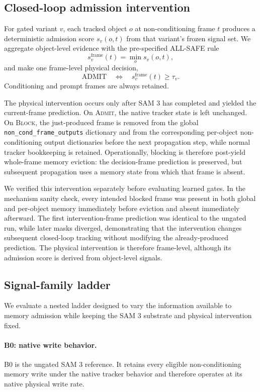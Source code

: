 \documentclass[10pt,twocolumn,letterpaper]{article}
\begin{document}
\subsection{Closed-loop admission intervention}

For gated variant \(v\), each tracked object \(o\) at non-conditioning frame
\(t\) produces a deterministic admission score \(s_v(o,t)\) from that
variant's frozen signal set.  We aggregate object-level evidence with the
pre-specified ALL-SAFE rule
\[
    s^{\mathrm{frame}}_v(t)=\min_o s_v(o,t),
\]
and make one frame-level physical decision,
\[
    \mathrm{ADMIT}
    \quad\Longleftrightarrow\quad
    s^{\mathrm{frame}}_v(t)\geq\tau_v.
\]
Conditioning and prompt frames are always retained.

The physical intervention occurs only after SAM 3 has completed and yielded
the current-frame prediction.  On \textsc{Admit}, the native tracker state is
left unchanged.  On \textsc{Block}, the just-produced frame is removed from
the global \texttt{non\_cond\_frame\_outputs} dictionary and from the
corresponding per-object non-conditioning output dictionaries before the
next propagation step, while normal tracker bookkeeping is retained.
Operationally, blocking is therefore post-yield whole-frame memory eviction:
the decision-frame prediction is preserved, but subsequent propagation uses
a memory state from which that frame is absent.

We verified this intervention separately before evaluating learned gates.
In the mechanism sanity check, every intended blocked frame was present in
both global and per-object memory immediately before eviction and absent
immediately afterward.  The first intervention-frame prediction was
identical to the ungated run, while later masks diverged, demonstrating that
the intervention changes subsequent closed-loop tracking without modifying
the already-produced prediction.  The physical intervention is therefore
frame-level, although its admission score is derived from object-level
signals.

\subsection{Signal-family ladder}

We evaluate a nested ladder designed to vary the information available to
memory admission while keeping the SAM 3 substrate and physical intervention
fixed.

\paragraph{B0: native write behavior.}
B0 is the ungated SAM 3 reference.  It retains every eligible
non-conditioning memory write under the native tracker behavior and therefore
operates at its native physical write rate.
\end{document}
